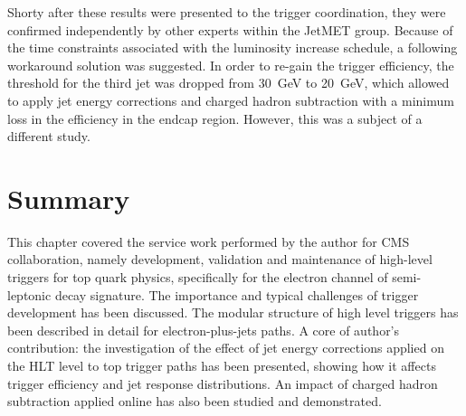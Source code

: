 Shorty after these results were presented to the trigger coordination, they were confirmed independently by other
experts within the JetMET group. Because of the time constraints associated with the luminosity increase schedule, a
following workaround solution was suggested. In order to re-gain the trigger efficiency, the threshold for the third jet
was dropped from \SI{30}{\GeV} to \SI{20}{\GeV}, which allowed to apply jet energy corrections and charged hadron
subtraction with a minimum loss in the efficiency in the endcap region. However, this was a subject of a different
study.

\section{Summary}
This chapter covered the service work performed by the author for CMS collaboration, namely development, validation and
maintenance of high-level triggers for top quark physics, specifically for the electron channel of semi-leptonic \ttbar
decay signature. The importance and typical challenges of trigger development has been discussed. The modular structure
of high level triggers has been described in detail for electron-plus-jets paths. A core of author's contribution: the
investigation of the effect of jet energy corrections applied on the HLT level to top trigger paths has been presented,
showing how it affects trigger efficiency and jet response distributions. An impact of charged hadron subtraction
applied online has also been studied and demonstrated.



